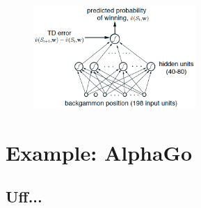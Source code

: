 \documentclass[a4paper]{article}
\begin{document}
		\begin{figure}[htb!]
			\centering
			\includegraphics[width=0.55\textwidth]{img/08_reinforcement_learning/td_gammon.png}
		\end{figure}
	
	\section{Example: AlphaGo}
		
		\subsection{Uff...}
		


		
		
	
	
	
	
	
	
	

	
\end{document}
